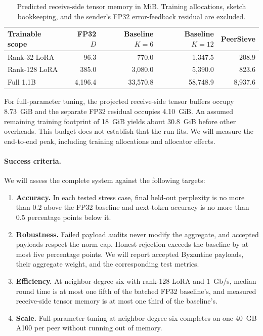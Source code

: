 \documentclass{article}
\begin{document}
\begin{table}[tbp]
  \caption{Predicted receive-side tensor memory in MiB. Training allocations, sketch bookkeeping, and the sender's FP32 error-feedback residual are excluded.}
  \label{tab:vram}
  \centering\small
  \begin{tabularx}{\linewidth}{@{}Yrrrr@{}}
    \toprule
    Trainable scope & FP32 $D$ & Baseline $K=6$ & Baseline $K=12$ & PeerSieve \\
    \midrule
    Rank-32 LoRA & 96.3 & 770.0 & 1,347.5 & 208.9 \\
    Rank-128 LoRA & 385.0 & 3,080.0 & 5,390.0 & 823.6 \\
    Full 1.1B & 4,196.4 & 33,570.8 & 58,748.9 & 8,937.6 \\
    \bottomrule
  \end{tabularx}
\end{table}

For full-parameter tuning, the projected receive-side tensor buffers occupy 8.73~GiB and the separate FP32 residual occupies 4.10~GiB. An assumed remaining training footprint of 18~GiB yields about 30.8~GiB before other overheads. This budget does not establish that the run fits. We will measure the end-to-end peak, including training allocations and allocator effects.

\paragraph{Success criteria.} We will assess the complete system against the following targets:
\begin{enumerate}
  \item \textbf{Accuracy.} In each tested stress case, final held-out perplexity is no more than $0.2$ above the FP32 baseline and next-token accuracy is no more than $0.5$ percentage points below it.
  \item \textbf{Robustness.} Failed payload audits never modify the aggregate, and accepted payloads respect the norm cap. Honest rejection exceeds the baseline by at most five percentage points. We will report accepted Byzantine payloads, their aggregate weight, and the corresponding test metrics.
  \item \textbf{Efficiency.} At neighbor degree six with rank-128 LoRA and $1$~Gb/s, median round time is at most one fifth of the batched FP32 baseline's, and measured receive-side tensor memory is at most one third of the baseline's.
  \item \textbf{Scale.} Full-parameter tuning at neighbor degree six completes on one 40~GB A100 per peer without running out of memory.
\end{enumerate}
\end{document}
